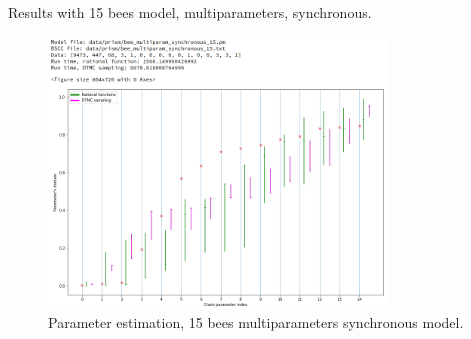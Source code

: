 \documentclass[12pt]{article}
\theoremstyle{definition}
\begin{document}
Results with 15 bees model, multiparameters, synchronous.
\begin{figure}[H]
  \centering
  \includegraphics[width=0.8\textwidth,keepaspectratio]{figures/normal_15.png}
  \caption{Parameter estimation, 15 bees multiparameters synchronous model.}
\end{figure}
\end{document}
